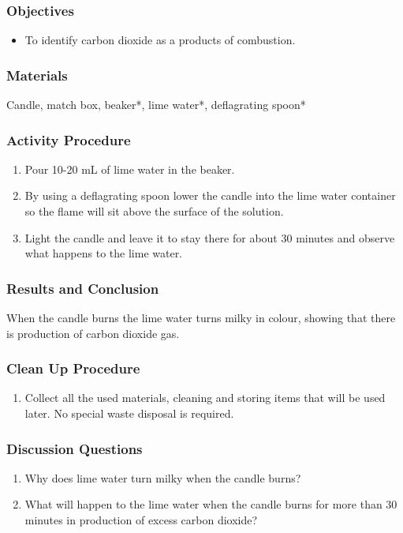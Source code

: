 \subsubsection*{Objectives}
\begin{itemize}
\item{To identify carbon dioxide as a products of combustion.}
\end{itemize}

\subsubsection*{Materials}
Candle, match box, beaker*, lime water*, deflagrating spoon*

\subsubsection*{Activity Procedure}
\begin{enumerate}
\item{Pour 10-20 mL of lime water in the beaker.}
\item{By using a deflagrating spoon lower the candle into the lime water container so the flame will sit above the surface of the solution.}
\item{Light the candle and leave it to stay there for about 30 minutes and observe what happens to the lime water.}
\end{enumerate}

\subsubsection*{Results and Conclusion}
When the candle burns the lime water turns milky in colour, showing that there is production of carbon dioxide gas.

\subsubsection*{Clean Up Procedure}
\begin{enumerate}
\item{Collect all the used materials, cleaning and storing items that will be used later. No special waste disposal is required.}
\end{enumerate}

\subsubsection*{Discussion Questions}
\begin{enumerate}
\item{Why does lime water turn milky when the candle burns?}
\item{What will happen to the lime water when the candle burns for more than 30 minutes in production of excess carbon dioxide?}
\end{enumerate}

